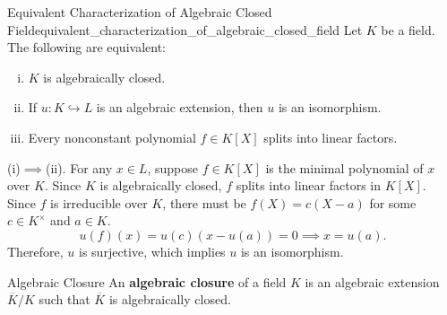 \begin{proposition}{Equivalent Characterization of Algebraic Closed Field}{equivalent_characterization_of_algebraic_closed_field}
    Let $K$ be a field. The following are equivalent:
    \begin{enumerate}[(i)]
        \item $K$ is algebraically closed.
        \item If $u:K\hookrightarrow L$ is an algebraic extension, then $u$ is an isomorphism.
        \item Every nonconstant polynomial $f\in K[X]$ splits into linear factors.
    \end{enumerate}
\end{proposition}
\begin{prf}
    (i)$\implies$(ii). For any $x\in L$, suppose $f\in K[X]$ is the minimal polynomial of $x$ over $K$. Since $K$ is algebraically closed, $f$ splits into linear factors in $K[X]$. Since $f$ is irreducible over $K$, there must be $f(X)=c(X-a)$ for some $c\in K^\times$ and $a\in K$. 
    \[
    u(f)(x)=u(c)(x-u(a))=0\implies x=u(a).
    \]
    Therefore, $u$ is surjective, which implies $u$ is an isomorphism.
\end{prf}

\begin{definition}{Algebraic Closure}{}
    An \textbf{algebraic closure} of a field $K$ is an algebraic extension $\overline{K}/K$ such that $\overline{K}$ is algebraically closed.
\end{definition}

